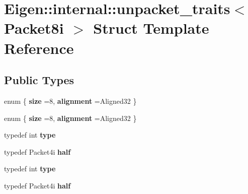 \hypertarget{struct_eigen_1_1internal_1_1unpacket__traits_3_01_packet8i_01_4}{}\section{Eigen\+:\+:internal\+:\+:unpacket\+\_\+traits$<$ Packet8i $>$ Struct Template Reference}
\label{struct_eigen_1_1internal_1_1unpacket__traits_3_01_packet8i_01_4}
\subsection*{Public Types}
\begin{DoxyCompactItemize}
\item 
\mbox{\label{struct_eigen_1_1internal_1_1unpacket__traits_3_01_packet8i_01_4_a016163f648e4f3139c6e686f6145209a}} 
enum \{ {\bfseries size} =8, 
{\bfseries alignment} =Aligned32
 \}
\item 
\mbox{\label{struct_eigen_1_1internal_1_1unpacket__traits_3_01_packet8i_01_4_a7e521ac36965d61094bf68ec36b0c7ba}} 
enum \{ {\bfseries size} =8, 
{\bfseries alignment} =Aligned32
 \}
\item 
\mbox{\label{struct_eigen_1_1internal_1_1unpacket__traits_3_01_packet8i_01_4_ae65a6864c3908f78ea40d59c580392ff}} 
typedef int {\bfseries type}
\item 
\mbox{\label{struct_eigen_1_1internal_1_1unpacket__traits_3_01_packet8i_01_4_a90ccb43bd0d41a92680f391bae3b04d5}} 
typedef Packet4i {\bfseries half}
\item 
\mbox{\label{struct_eigen_1_1internal_1_1unpacket__traits_3_01_packet8i_01_4_ae65a6864c3908f78ea40d59c580392ff}} 
typedef int {\bfseries type}
\item 
\mbox{\label{struct_eigen_1_1internal_1_1unpacket__traits_3_01_packet8i_01_4_a90ccb43bd0d41a92680f391bae3b04d5}} 
typedef Packet4i {\bfseries half}
\end{DoxyCompactItemize}


